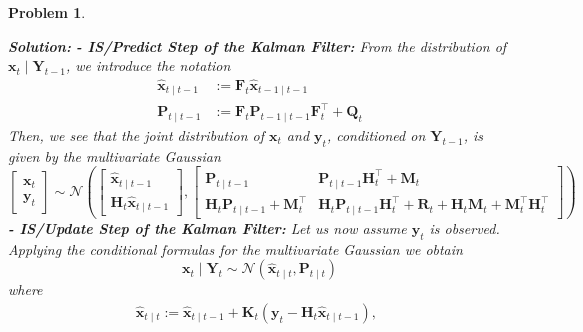 \documentclass[11pt]{article}
\theoremstyle{plain} %
\newtheorem{problem}[theorem]{Problem}
\newenvironment{solution}
{\color{C2}\normalfont\begin{framed}\begingroup\textbf{Solution:} }
  {\endgroup\end{framed}}
\theoremstyle{remark}
\begin{document}
\begin{problem}
\begin{enumerate}[label=(\alph*)]
\begin{solution}
          \textbf{- IS/Predict Step of the Kalman Filter:} From the distribution of $\mathbf{x}_{t} \mid \mathbf{Y}_{t-1}$, we introduce the notation
          $$
            \begin{aligned}
              \hat{\mathbf{x}}_{t \mid t-1} & :=\mathbf{F}_{t} \hat{\mathbf{x}}_{t-1 \mid t-1}                              \\
              \mathbf{P}_{t \mid t-1}       & :=\mathbf{F}_{t} \mathbf{P}_{t-1 \mid t-1} \mathbf{F}_{t}^\top+\mathbf{Q}_{t}
            \end{aligned}
          $$
          Then, we see that the joint distribution of
          $\mathbf{x}_{t}$ and $\mathbf{y}_{t}$, conditioned on $\mathbf{Y}_{t-1}$, is given by the multivariate Gaussian
          $$
            \left[\begin{array}{l}
                \mathbf{x}_{t} \\
                \mathbf{y}_{t}
              \end{array}\right] \sim \mathcal{N}\left(\left[\begin{array}{c}
                \hat{\mathbf{x}}_{t \mid t-1} \\
                \mathbf{H}_{t} \hat{\mathbf{x}}_{t \mid t-1}
              \end{array}\right],\left[\begin{array}{cc}
                \mathbf{P}_{t \mid t-1}                                       & \mathbf{P}_{t \mid t-1} \mathbf{H}_{t}^\top  + \mathbf{M}_{t}                                                                                     \\
                \mathbf{H}_{t} \mathbf{P}_{t \mid t-1}  + \mathbf{M}_{t}^\top & \mathbf{H}_{t} \mathbf{P}_{t \mid t-1} \mathbf{H}_{t}^\top+\mathbf{R}_{t} + \mathbf{H}_{t}\mathbf{M}_{t} + \mathbf{M}_{t}^\top\mathbf{H}_{t}^\top
              \end{array}\right]\right)
          $$
          \textbf{- IS/Update Step of the Kalman Filter:}
          Let us now assume $\mathbf{y}_{t}$ is observed.
          Applying the conditional formulas for the multivariate Gaussian we obtain
          $$
            \mathbf{x}_{t} \mid \mathbf{Y}_{t} \sim \mathcal{N}\left(\hat{\mathbf{x}}_{t \mid t}, \mathbf{P}_{t \mid t}\right)
          $$
          where
          \begin{align*}
            \hat{\mathbf{x}}_{t \mid t} :=\hat{\mathbf{x}}_{t \mid t-1}+\mathbf{K}_{t}\left(\mathbf{y}_{t}-\mathbf{H}_{t} \hat{\mathbf{x}}_{t \mid t-1}\right), ~~

\end{align*}
\end{solution}
\end{enumerate}
\end{problem}
\end{document}
